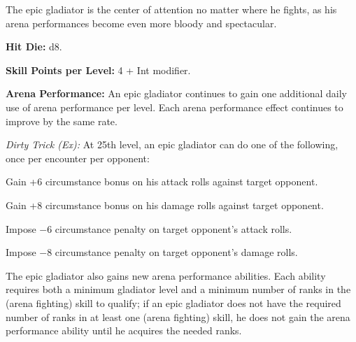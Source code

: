 
The epic gladiator is the center of attention no matter where he fights, as his arena performances become even more bloody and spectacular.

\textbf{Hit Die:} d8.

\textbf{Skill Points per Level:} 4 + Int modifier.

\textbf{Arena Performance:} An epic gladiator continues to gain one additional daily use of arena performance per level. Each arena performance effect continues to improve by the same rate.

\textit{Dirty Trick (Ex):} At 25th level, an epic gladiator can do one of the following, once per encounter per opponent:

\begin{itemize*}
\item Gain +6 circumstance bonus on his attack rolls against target opponent.
\item Gain +8 circumstance bonus on his damage rolls against target opponent.
\item Impose $-6$ circumstance penalty on target opponent's attack rolls.
\item Impose $-8$ circumstance penalty on target opponent's damage rolls.
\end{itemize*}

The epic gladiator also gains new arena performance abilities. Each ability requires both a minimum gladiator level and a minimum number of ranks in the  (arena fighting) skill to qualify; if an epic gladiator does not have the required number of ranks in at least one  (arena fighting) skill, he does not gain the arena performance ability until he acquires the needed ranks.

